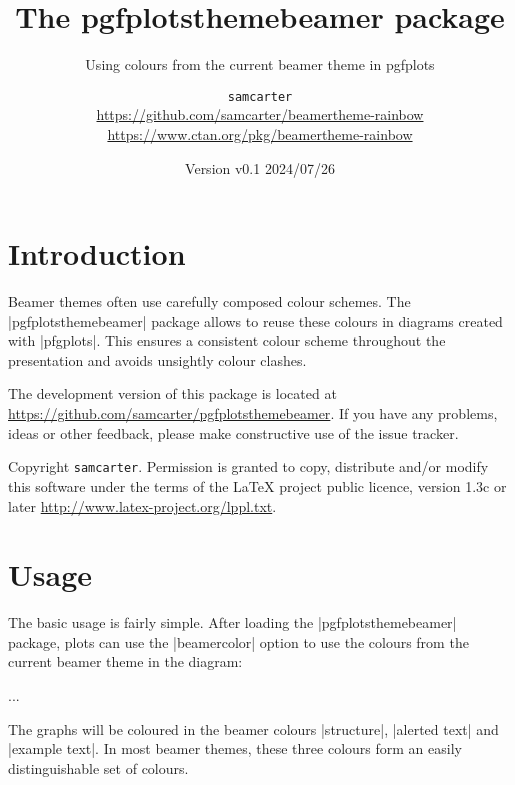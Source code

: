\documentclass{scrartcl}
\title{The pgfplotsthemebeamer package}
\subtitle{Using colours from the current beamer theme in pgfplots}
\author{%
  \texorpdfstring{
    \texttt{samcarter}\\
    \url{https://github.com/samcarter/beamertheme-rainbow}\\
    \url{https://www.ctan.org/pkg/beamertheme-rainbow}
  }{samcarter}}
\date{Version v0.1 \textendash{} 2024/07/26}
\begin{document}
\maketitle

\section{Introduction}
\label{intro}

Beamer themes often use carefully composed colour schemes. The \saminline|pgfplotsthemebeamer| package allows to reuse these colours in diagrams created with \saminline|pfgplots|. This ensures a consistent colour scheme throughout the presentation and avoids unsightly colour clashes.

The development version of this package is located at \url{https://github.com/samcarter/pgfplotsthemebeamer}. If you have any problems, ideas or other feedback, please make constructive use of the issue tracker.

Copyright  \texttt{samcarter}. Permission is granted to copy, distribute and\slash or modify this software under the terms of the LaTeX project public licence, version 1.3c or later \url{http://www.latex-project.org/lppl.txt}.

\section{Usage}

The basic usage is fairly simple. After loading the \saminline|pgfplotsthemebeamer| package, plots can use the \saminline|beamercolor| option to use the colours from the current beamer theme in the diagram:
\begin{tcolorbox}[title={Usage}]
\begin{samcode}
\usepackage{pgfplotsthemebeamer}

\begin{axis}[
  beamercolors
]
...
\end{axis}
\end{samcode}
\end{tcolorbox}
The graphs will be coloured in the beamer colours \saminline|structure|, \saminline|alerted text| and \saminline|example text|. In most beamer themes, these three colours form an easily distinguishable set of colours.
\end{document}

